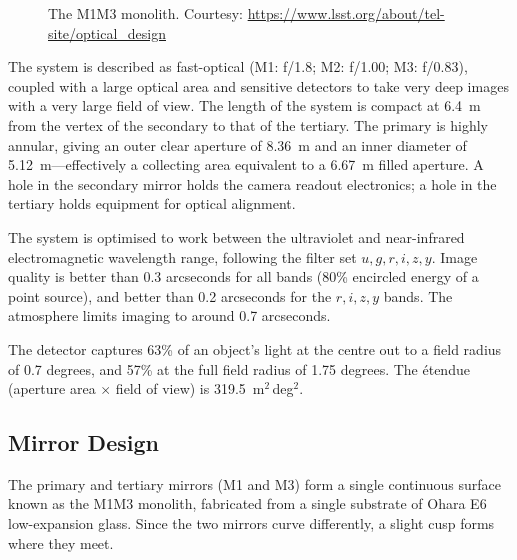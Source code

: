 \documentclass[12pt,a4paper]{article}
\begin{document}
\begin{figure}[htbp]
  \centering
  \caption{The M1M3 monolith.
           Courtesy: \url{https://www.lsst.org/about/tel-site/optical_design}}
  \label{fig:m1m3}
\end{figure}

The system is described as fast-optical (M1: f/1.8; M2: f/1.00; M3: f/0.83),
coupled with a large optical area and sensitive detectors to take very deep
images with a very large field of view. The length of the system is compact at
6.4~m from the vertex of the secondary to that of the tertiary. The primary
is highly annular, giving an outer clear aperture of 8.36~m and an inner
diameter of 5.12~m---effectively a collecting area equivalent to a 6.67~m
filled aperture. A hole in the secondary mirror holds the camera readout
electronics; a hole in the tertiary holds equipment for optical alignment.

The system is optimised to work between the ultraviolet and near-infrared
electromagnetic wavelength range, following the filter set $u, g, r, i, z, y$.
Image quality is better than 0.3 arcseconds for all bands (80\% encircled
energy of a point source), and better than 0.2 arcseconds for the $r, i, z, y$
bands. The atmosphere limits imaging to around 0.7 arcseconds.

The detector captures 63\% of an object's light at the centre out to a field
radius of 0.7 degrees, and 57\% at the full field radius of 1.75 degrees. The
\'{e}tendue (aperture area $\times$ field of view) is
319.5~m$^{2}$\,deg$^{2}$.

\subsection{Mirror Design}

The primary and tertiary mirrors (M1 and M3) form a single continuous surface
known as the M1M3 monolith, fabricated from a single substrate of Ohara E6
low-expansion glass. Since the two mirrors curve differently, a slight cusp
forms where they meet.
\end{document}
